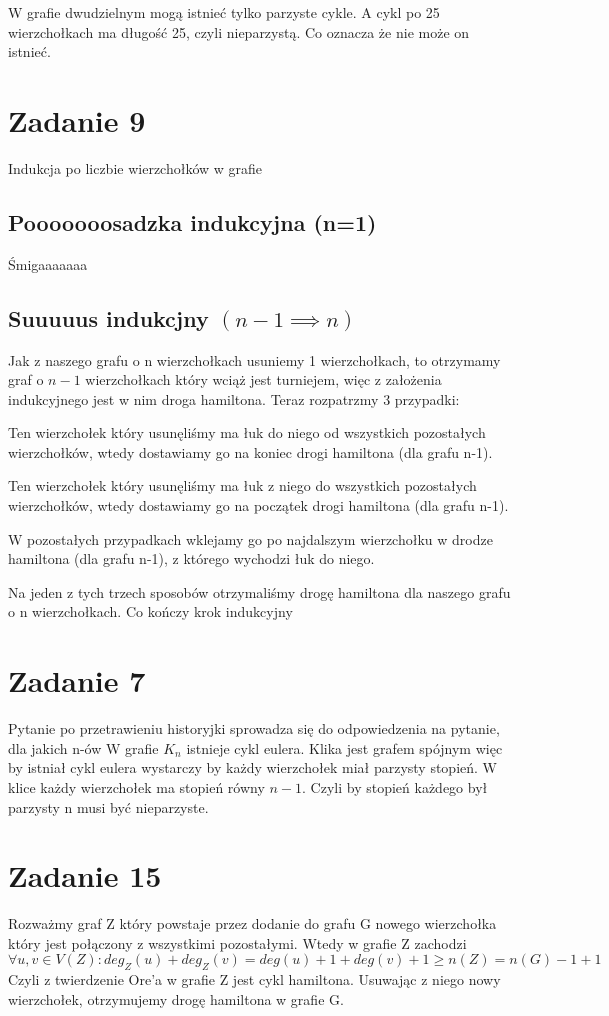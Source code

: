 \documentclass{article}
\begin{document}
W grafie dwudzielnym mogą istnieć tylko parzyste cykle. A cykl po 25 wierzchołkach ma długość 25, czyli nieparzystą. Co oznacza że nie może on istnieć.

\section*{Zadanie 9}
Indukcja po liczbie wierzchołków w grafie
\subsection*{Pooooooosadzka indukcyjna (n=1)}
Śmigaaaaaaa
\subsection*{Suuuuus indukcjny $(n-1 \implies n)$}
Jak z naszego grafu o n wierzchołkach usuniemy 1 wierzchołkach, to otrzymamy graf o $n-1$ wierzchołkach który wciąż jest turniejem, więc z założenia indukcyjnego jest w nim droga hamiltona. Teraz rozpatrzmy 3 przypadki:

Ten wierzchołek który usunęliśmy ma łuk do niego od wszystkich pozostałych wierzchołków, wtedy dostawiamy go na koniec drogi hamiltona (dla grafu n-1). 

Ten wierzchołek który usunęliśmy ma łuk z niego do wszystkich pozostałych wierzchołków, wtedy dostawiamy go na początek drogi hamiltona (dla grafu n-1). 

W pozostałych przypadkach wklejamy go po najdalszym wierzchołku w drodze hamiltona (dla grafu n-1), z którego wychodzi łuk do niego. 

Na jeden z tych trzech sposobów otrzymaliśmy drogę hamiltona dla naszego grafu o n wierzchołkach. Co kończy krok indukcyjny

\section*{Zadanie 7}
Pytanie po przetrawieniu historyjki sprowadza się do odpowiedzenia na pytanie, dla jakich n-ów W grafie $K_n$ istnieje cykl eulera. Klika jest grafem spójnym więc by istniał cykl eulera wystarczy by każdy wierzchołek miał parzysty stopień. W  klice każdy wierzchołek ma stopień równy $n-1$. Czyli by stopień każdego był parzysty n musi być nieparzyste.

\section*{Zadanie 15}
Rozważmy graf Z który powstaje przez dodanie do grafu G nowego wierzchołka który jest połączony z wszystkimi pozostałymi. Wtedy w grafie Z zachodzi \[\forall u,v \in V(Z): deg_Z(u) + deg_Z(v) = deg(u) + 1 + deg(v) + 1 \geq   n(Z) = n(G) - 1 + 1\]
Czyli z twierdzenie Ore'a w grafie Z jest cykl hamiltona. Usuwając z niego nowy wierzchołek, otrzymujemy drogę hamiltona w grafie G.
\end{document}
